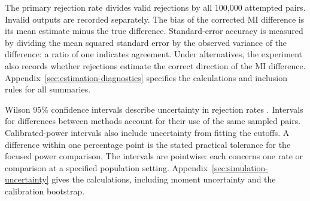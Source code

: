 The primary rejection rate divides valid rejections by all 100,000
attempted pairs. Invalid outputs are recorded separately. The bias of
the corrected MI difference is its mean estimate minus the true
difference. Standard-error accuracy is measured by dividing the mean
squared standard error by the observed variance of the difference:
a ratio of one indicates agreement. Under alternatives, the experiment
also records whether rejections estimate the correct direction of the
MI difference. Appendix~\ref{sec:estimation-diagnostics} specifies the
calculations and inclusion rules for all summaries.

Wilson 95\% confidence intervals describe uncertainty in rejection rates
\citep{wilson1927}. Intervals for differences between methods account
for their use of the same sampled pairs. Calibrated-power intervals also
include uncertainty from fitting the cutoffs. A difference within one
percentage point is the stated practical tolerance for the focused
power comparison. The intervals are pointwise: each concerns one rate
or comparison at a specified population setting. Appendix~\ref{sec:simulation-uncertainty} gives the
calculations, including moment uncertainty and the calibration bootstrap.
